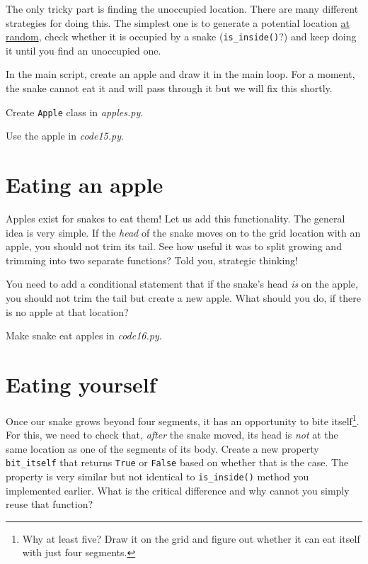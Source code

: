 \documentclass[
]{book}
\begin{document}
The only tricky part is finding the unoccupied location. There are many different strategies for doing this. The simplest one is to generate a potential location \href{https://docs.python.org/3/library/random.html\#random.randrange}{at random}, check whether it is occupied by a snake (\texttt{is\_inside()}?) and keep doing it until you find an unoccupied one.

In the main script, create an apple and draw it in the main loop. For a moment, the snake cannot eat it and will pass through it but we will fix this shortly.

Create \texttt{Apple} class in \emph{apples.py}.

Use the apple in \emph{code15.py}.

\hypertarget{eating-an-apple}{%
\section{Eating an apple}\label{eating-an-apple}}

Apples exist for snakes to eat them! Let us add this functionality. The general idea is very simple. If the \emph{head} of the snake moves on to the grid location with an apple, you should not trim its tail. See how useful it was to split growing and trimming into two separate functions? Told you, strategic thinking!

You need to add a conditional statement that if the snake's head \emph{is} on the apple, you should not trim the tail but create a new apple. What should you do, if there is no apple at that location?

Make snake eat apples in \emph{code16.py}.

\hypertarget{eating-yourself}{%
\section{Eating yourself}\label{eating-yourself}}

Once our snake grows beyond four segments, it has an opportunity to bite itself\footnote{Why at least five? Draw it on the grid and figure out whether it can eat itself with just four segments.}. For this, we need to check that, \emph{after} the snake moved, its head is \emph{not} at the same location as one of the segments of its body. Create a new property \texttt{bit\_itself} that returns \texttt{True} or \texttt{False} based on whether that is the case. The property is very similar but not identical to \texttt{is\_inside()} method you implemented earlier. What is the critical difference and why cannot you simply reuse that function?
\end{document}
